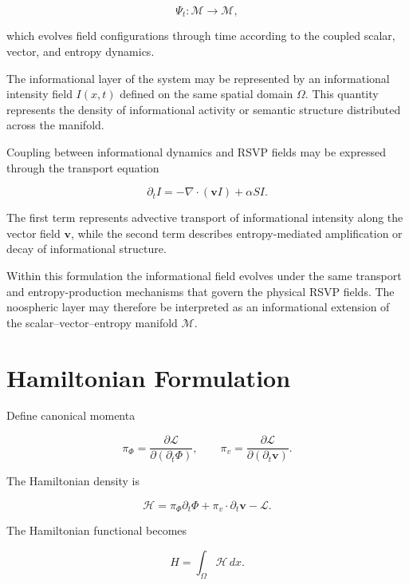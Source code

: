 \documentclass[12pt]{article}
\begin{document}
\begin{equation}
\Psi_t : \mathcal{M} \rightarrow \mathcal{M},
\end{equation}

which evolves field configurations through time according to the coupled scalar, vector, and entropy dynamics.

The informational layer of the system may be represented by an informational intensity field $I(x,t)$ defined on the same spatial domain $\Omega$. This quantity represents the density of informational activity or semantic structure distributed across the manifold.

Coupling between informational dynamics and RSVP fields may be expressed through the transport equation

\begin{equation}
\partial_t I
=
-\nabla \cdot (\mathbf{v} I)
+
\alpha S I .
\end{equation}

The first term represents advective transport of informational intensity along the vector field $\mathbf{v}$, while the second term describes entropy-mediated amplification or decay of informational structure.

Within this formulation the informational field evolves under the same transport and entropy-production mechanisms that govern the physical RSVP fields. The noospheric layer may therefore be interpreted as an informational extension of the scalar–vector–entropy manifold $\mathcal{M}$.

\section{Hamiltonian Formulation}

Define canonical momenta

\begin{equation}
\pi_\Phi = \frac{\partial \mathcal{L}}{\partial (\partial_t \Phi)},
\qquad
\pi_v = \frac{\partial \mathcal{L}}{\partial (\partial_t \mathbf{v})}.
\end{equation}

The Hamiltonian density is

\begin{equation}
\mathcal{H}
=
\pi_\Phi \partial_t \Phi
+
\pi_v \cdot \partial_t \mathbf{v}
-
\mathcal{L}.
\end{equation}

The Hamiltonian functional becomes

\begin{equation}
H = \int_\Omega \mathcal{H}\,dx .
\end{equation}
\end{document}
